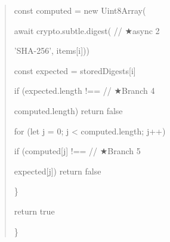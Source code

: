 \documentclass[conference]{IEEEtran}
\begin{document}
\begin{quote}
const computed = new Uint8Array(

await crypto.subtle.digest( // ★async 2

'SHA-256', items{[}i{]}))

const expected = storedDigests{[}i{]}

if (expected.length !== // ★Branch 4

computed.length) return false

for (let j = 0; j \textless{} computed.length; j++)

if (computed{[}j{]} !== // ★Branch 5

expected{[}j{]}) return false

\}

return true

\}
\end{quote}


\balance
\end{document}
